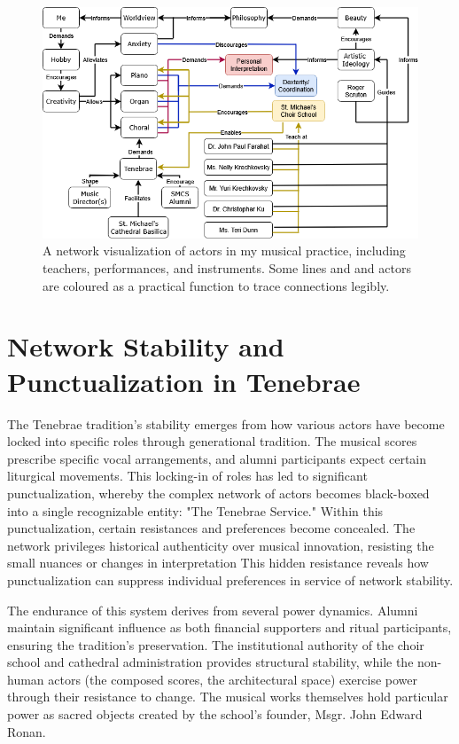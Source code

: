 \documentclass{article} %
\begin{document}
\begin{figure}[h!]            %
  \centering
  \includegraphics[width=1\linewidth]{Figs/Actor_Network.png}
  \caption{A network visualization of actors in my musical practice, including teachers, performances, and instruments. Some lines and and actors are coloured as a practical function to trace connections legibly.}
  \label{fig:actor_network}
\end{figure}

\section{Network Stability and Punctualization in Tenebrae}

The Tenebrae tradition's stability emerges from how various actors have become locked into specific roles through generational tradition.
The musical scores prescribe specific vocal arrangements, and alumni participants expect certain liturgical movements.
This locking-in of roles has led to significant punctualization, whereby the complex network of actors becomes black-boxed into a single recognizable entity: "The Tenebrae Service."
Within this punctualization, certain resistances and preferences become concealed.
The network privileges historical authenticity over musical innovation, resisting the small nuances or changes in interpretation
This hidden resistance reveals how punctualization can suppress individual preferences in service of network stability.

The endurance of this system derives from several power dynamics. 
Alumni maintain significant influence as both financial supporters and ritual participants, ensuring the tradition's preservation. 
The institutional authority of the choir school and cathedral administration provides structural stability, while the non-human actors (the composed scores, the architectural space) exercise power through their resistance to change. 
The musical works themselves hold particular power as sacred objects created by the school's founder, Msgr. John Edward Ronan.
\end{document}

